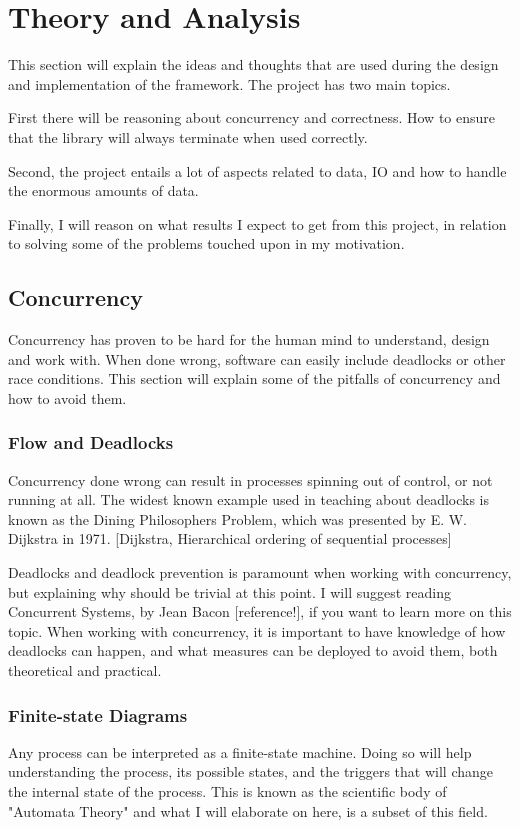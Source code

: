 \documentclass[a4paper]{article}
\begin{document}
\section{Theory and Analysis}
This section will explain the ideas and thoughts that are used during the design and implementation of the framework.
The project has two main topics.

First there will be reasoning about concurrency and correctness. How to ensure that the
library will always terminate when used correctly.

Second, the project entails a lot of aspects related to data, IO and
how to handle the enormous amounts of data.

Finally, I will reason on what results I expect to get from this project, in relation to solving some of the problems touched upon in my motivation.



\subsection{Concurrency}
Concurrency has proven to be hard for the human mind to understand, design and work with. When done wrong, software can easily
include deadlocks or other race conditions. This section will explain some of the pitfalls of concurrency and how to avoid them.


\subsubsection{Flow and Deadlocks}
Concurrency done wrong can result in processes spinning out of control, or not running at all. The widest known example used in teaching about deadlocks is known as the Dining Philosophers Problem, which was presented by E. W. Dijkstra in 1971. [Dijkstra, Hierarchical ordering of sequential processes]

Deadlocks and deadlock prevention is paramount when working with concurrency, but explaining why should be trivial at this point. I will suggest reading Concurrent Systems, by Jean Bacon [reference!], if you want to learn more on this topic. When working with concurrency, it is important to have knowledge of how deadlocks can happen, and what measures can be deployed to avoid them, both theoretical and practical.


\subsubsection{Finite-state Diagrams}
Any process can be interpreted as a finite-state machine. Doing so will help understanding the process, its possible states, and the triggers that will change the internal state of the process. This is known as the scientific body of "Automata Theory" and what I will elaborate on here, is a subset of this field.
\end{document}

